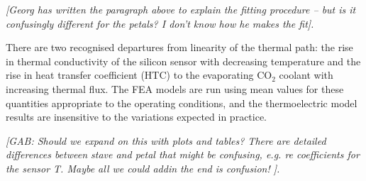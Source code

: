 \textit{[Georg has written the paragraph above to explain the fitting procedure – but is it confusingly different for the petals? I don’t know how he makes the fit].}

There are two recognised departures from linearity of the thermal path: the rise in thermal conductivity of the silicon sensor with decreasing temperature and the rise in heat transfer coefficient (HTC) to the evaporating CO$_2$ coolant with increasing thermal flux. The FEA models are run using mean values for these quantities appropriate to the operating conditions, and the thermoelectric model results are insensitive to the variations expected in practice.

\textit{[GAB: Should we expand on this with plots and tables? There are detailed differences between stave and petal that might be confusing, e.g. re coefficients for the sensor T.      Maybe all we could addin the end is confusion! ].}




